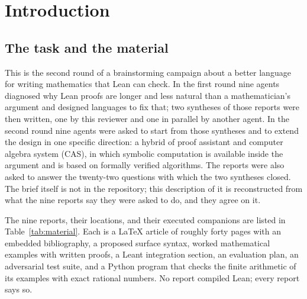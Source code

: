 \documentclass[11pt,a4paper]{article}
\theoremstyle{definition}
\begin{document}
\section{Introduction}\label{sec:intro}

\subsection{The task and the material}\label{sec:material}
This is the second round of a brainstorming campaign about a better language for writing mathematics that Lean can check. In the first round nine agents diagnosed why Lean proofs are longer and less natural than a mathematician's argument and designed languages to fix that; two syntheses of those reports were then written, one by this reviewer and one in parallel by another agent. In the second round nine agents were asked to start from those syntheses and to extend the design in one specific direction: a hybrid of proof assistant and computer algebra system (CAS), in which symbolic computation is available inside the argument and is based on formally verified algorithms. The reports were also asked to answer the twenty-two questions with which the two syntheses closed. The brief itself is not in the repository; this description of it is reconstructed from what the nine reports say they were asked to do, and they agree on it.

The nine reports, their locations, and their executed companions are listed in Table~\ref{tab:material}. Each is a LaTeX article of roughly forty pages with an embedded bibliography, a proposed surface syntax, worked mathematical examples with written proofs, a Leant integration section, an evaluation plan, an adversarial test suite, and a Python program that checks the finite arithmetic of its examples with exact rational numbers. No report compiled Lean; every report says so.
\end{document}
